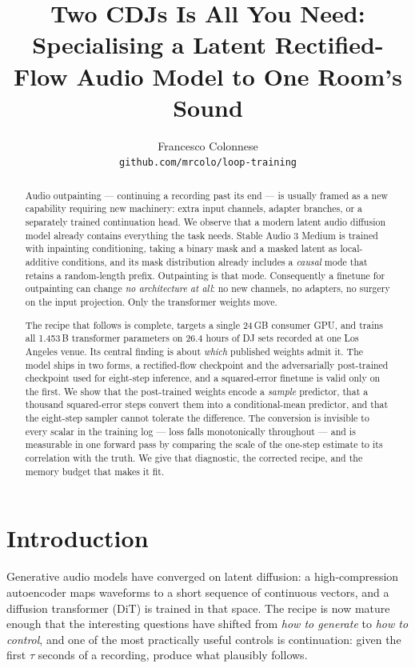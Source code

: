 \documentclass[10pt,twocolumn,letterpaper]{article}
\title{\vspace{-2em}\textbf{Two CDJs Is All You Need:\\
Specialising a Latent Rectified-Flow Audio Model to One Room's Sound}}
\author{Francesco Colonnese\\
\texttt{github.com/mrcolo/loop-training}}
\date{}
\begin{document}
\maketitle

\begin{abstract}
Audio outpainting --- continuing a recording past its end --- is usually framed as a
new capability requiring new machinery: extra input channels, adapter branches, or a
separately trained continuation head. We observe that a modern latent audio diffusion
model already contains everything the task needs. Stable Audio 3 Medium is trained with
inpainting conditioning, taking a binary mask and a masked latent as local-additive
conditions, and its mask distribution already includes a \emph{causal} mode that retains
a random-length prefix. Outpainting is that mode. Consequently a finetune for
outpainting can change \emph{no architecture at all}: no new channels, no adapters, no
surgery on the input projection. Only the transformer weights move.

The recipe that follows is complete, targets a single 24\,GB consumer GPU, and trains
all 1.453\,B transformer parameters on 26.4 hours of DJ sets recorded at one Los
Angeles venue. Its central finding is about \emph{which} published
weights admit it. The model ships in two forms, a rectified-flow checkpoint and the
adversarially post-trained checkpoint used for eight-step inference, and a squared-error
finetune is valid only on the first. We show that the post-trained weights encode a
\emph{sample} predictor, that a thousand squared-error steps convert them into a
conditional-mean predictor, and that the eight-step sampler cannot tolerate the
difference. The conversion is invisible to every scalar in the training log --- loss
falls monotonically throughout --- and is measurable in one forward pass by comparing
the scale of the one-step estimate to its correlation with the truth. We give that
diagnostic, the corrected recipe, and the memory budget that makes it fit.
\end{abstract}

\section{Introduction}

Generative audio models have converged on latent diffusion: a high-compression
autoencoder maps waveforms to a short sequence of continuous vectors, and a diffusion
transformer (DiT) is trained in that space. The recipe is now mature enough that the
interesting questions have shifted from \emph{how to generate} to \emph{how to control},
and one of the most practically useful controls is continuation: given the first
$\tau$ seconds of a recording, produce what plausibly follows.
\end{document}
